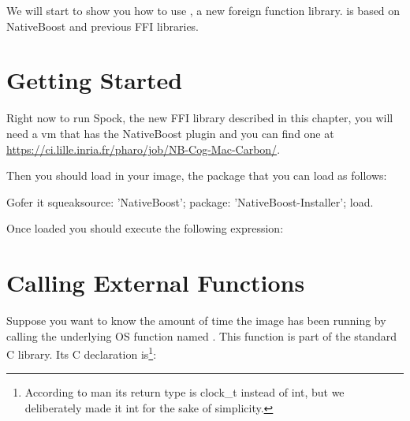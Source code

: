 \documentclass[a4paper,10pt,twoside]{book}
\begin{document}
We will start to show you how to use \Spock, a new foreign function library. \Spock is based on NativeBoost and previous FFI libraries.


\section{Getting Started}



Right now to run Spock, the new FFI library described in this chapter, you will need a vm that has the NativeBoost plugin and  you can find one at \url{https://ci.lille.inria.fr/pharo/job/NB-Cog-Mac-Carbon/}.  

Then you should load in your image, the package  that you can load as follows:
\begin{code}{}
Gofer it
        squeaksource: 'NativeBoost';
        package: 'NativeBoost-Installer';
        load.
\end{code}

Once loaded you should execute the following expression: 


%
%
%
%
%
%
%
% 
%


\section{Calling External Functions}

Suppose you want to know the amount of time the image has been running by calling the underlying OS function named . 
This function is part of the standard C library. Its C declaration is\footnote{According to man its return type is clock\_t instead of int, but we deliberately made it int for the sake of simplicity. }:
\end{document}

